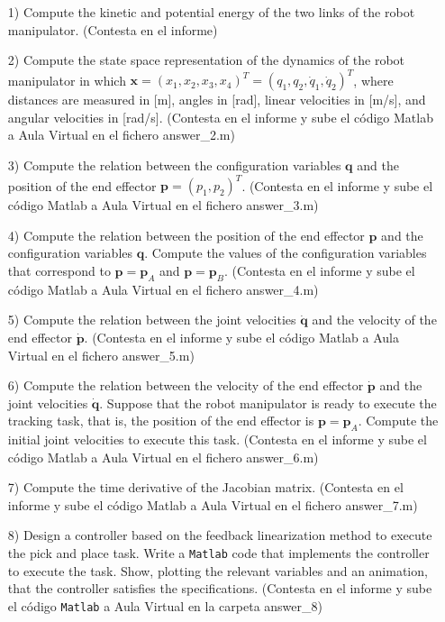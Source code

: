 \documentclass[a4paper]{article}
\begin{document}
\begin{itemize}

\item[1)] Compute the kinetic and potential energy of the two links of the robot manipulator. (Contesta en el informe)

\item[2)] 
Compute the state space representation of the dynamics of the robot manipulator in which $\mathbf{x} = (x_1,x_2,x_3,x_4)^T= (q_1, q_2, \dot{q}_1, \dot{q}_2)^T$, where distances are measured in [m], angles in [rad], linear velocities in [m/s], and angular velocities in [rad/s]. (Contesta en el informe y sube el c\'odigo Matlab a Aula Virtual en el fichero answer\_2.m)

\item[3)]
Compute the relation between the configuration variables 
$\mathbf{q}$ and the position of the end effector $\mathbf{p} = (p_1, p_2)^T$. (Contesta en el informe y sube el c\'odigo Matlab a Aula Virtual en el fichero answer\_3.m)

\item[4)]
Compute the relation between the position of the end effector $\mathbf{p}$ and 
the configuration variables  $\mathbf{q}$. Compute the values of the configuration variables 
that correspond to $\mathbf{p} =\mathbf{p} _A$ and $\mathbf{p} =\mathbf{p}_B$. (Contesta en el informe y sube el c\'odigo Matlab a Aula Virtual en el fichero answer\_4.m)

\item[5)]
Compute the relation between the joint velocities $\dot{\mathbf{q}}$ 
and the velocity of the end effector $\dot{\mathbf{p}}$. (Contesta en el informe y sube el c\'odigo Matlab a Aula Virtual en el fichero answer\_5.m)

\item[6)]
Compute the relation between the velocity of the end effector $\dot{\mathbf{p}}$ and the joint velocities $\dot{\mathbf{q}}$. 
Suppose that the robot manipulator is ready to execute the tracking task, that is, the position of the end effector is $\mathbf{p} =\mathbf{p} _A$. Compute the initial joint velocities to execute this task. (Contesta en el informe y sube el c\'odigo Matlab a Aula Virtual en el fichero answer\_6.m)

\item[7)] 
Compute the time derivative of the Jacobian matrix. (Contesta en el informe y sube el c\'odigo Matlab a Aula Virtual en el fichero answer\_7.m)


\item[8)] Design a controller based on the feedback linearization method to execute the pick and place task. Write a \texttt{Matlab} code that implements the controller to execute the task. Show, plotting the relevant variables and an animation, that the controller satisfies the specifications. (Contesta en el informe y sube el c\'odigo \texttt{Matlab} a Aula Virtual en la carpeta answer\_8)



\end{itemize}
\end{document}
